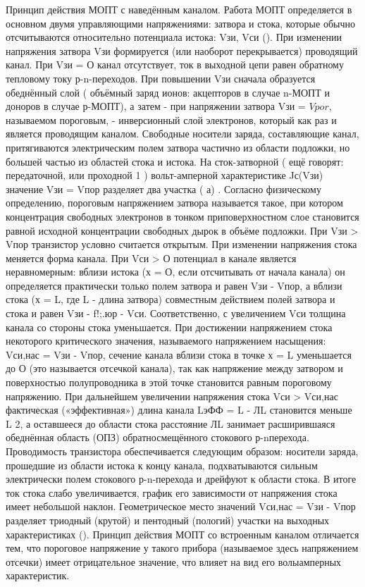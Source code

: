 \documentclass[a4paper,14pt]{article}
\begin{document}
Принцип действия МОПТ с наведённым каналом. Работа МОПТ
определяется в основном двумя управляющими напряжениями: затвора
и стока, которые обычно отсчитываются относительно потенциала истока:
Vзи, Vси ().
При изменении напряжения затвора Vзи формируется (или наоборот
перекрывается) проводящий канал. При Vзи = О канал отсутствует, ток в выходной
цепи равен обратному тепловому току р-n-переходов.
При повышении Vзи сначала образуется обеднённый слой ( объёмный заряд
ионов: акцепторов в случае n-МОПТ и доноров в случае р-МОПТ),
 а затем - при напряжении затвора Vзи = $Vpor$, называемом пороговым,
- инверсионный слой электронов, который как раз и является проводящим
каналом. Свободные носители заряда, составляющие канал,
притягиваются электрическим полем затвора частично из области подложки,
но большей частью из областей стока и истока. На сток-затворной
( ещё говорят: передаточной, или проходной 1 ) вольт-амперной характеристике
Jс(Vзи) значение Vзи = Vпор разделяет два участка ( а) . Согласно
физическому определению, пороговым напряжением затвора называется такое,
при котором концентрация свободных электронов в тонком приповерхностном
слое становится равной исходной концентрации свободных дырок в
объёме подложки. При Vзи > Vпор транзистор условно считается открытым.
При изменении напряжения стока меняется форма канала. При Vси > О
потенциал в канале является неравномерным: вблизи истока (х = О, если отсчитывать
от начала канала) он определяется практически только полем затвора
и равен Vзи - Vпор, а вблизи стока (х = L, где L - длина затвора) совместным
действием полей затвора и стока и равен Vзи - f!;.юр - Vси. Соответственно,
с увеличением Vси толщина канала со стороны стока уменьшается.
 При достижении напряжением стока некоторого критического
значения, называемого напряжением насыщения: Vси,нас = Vзи - Vпор, сечение
канала вблизи стока в точке х = L уменьшается до О (это называется отсечкой
канала), так как напряжение между затвором и поверхностью полупроводника
в этой точке становится равным пороговому напряжению.
При дальнейшем увеличении напряжения стока Vси > Vси,нас фактическая
(«эффективная») длина канала LэФФ = L - ЛL становится меньше L
2, а оставшееся до области стока расстояние ЛL занимает расширившаяся
обеднённая область (ОПЗ) обратносмещённого стокового р-nперехода.
Проводимость транзистора обеспечивается следующим образом:
носители заряда, прошедшие из области истока к концу канала, подхватываются
сильным электрически полем стокового р-n-перехода и дрейфуют к области
стока. В итоге ток стока слабо увеличивается, график его
зависимости от напряжения стока имеет небольшой наклон. Геометрическое
место значений Vси,нас = Vзи - Vпор разделяет триодный (крутой) и пентодный
(пологий) участки на выходных характеристиках ().
Принцип действия МОПТ со встроенным каналом отличается тем,
что пороговое напряжение у такого прибора (называемое здесь напряжением
отсечки) имеет отрицательное значение, что влияет на вид его волыамперных
характеристик.
\end{document}
